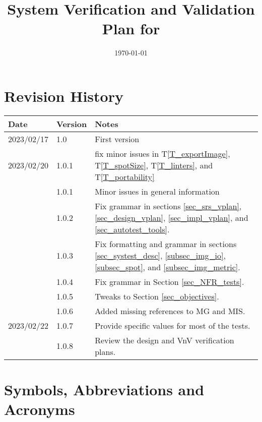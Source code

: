 \documentclass[12pt, titlepage]{article}
\begin{document}
\title{System Verification and Validation Plan for \progname{}} 
\author{\authname}
\date{\today}
	
\maketitle


\section{Revision History}

\begin{tabularx}{\textwidth}{p{2.2cm}p{1.8cm}X}
\toprule {\bf Date} & {\bf Version} & {\bf Notes}\\
\midrule
2023/02/17 & 1.0 & First version \\
2023/02/20 & 1.0.1 & fix minor issues in T\ref{T_exportImage}, T\ref{T_spotSize}, T\ref{T_linters}, 
  and T\ref{T_portability}\\
  & 1.0.1 & Minor issues in general information\\
  & 1.0.2 & Fix grammar in sections \ref{sec_srs_vplan}, 
  \ref{sec_design_vplan}, \ref{sec_impl_vplan}, and \ref{sec_autotest_tools}. \\
  & 1.0.3 & Fix formatting and grammar in sections \ref{sec_systest_desc}, 
  \ref{subsec_img_io}, \ref{subsec_spot}, and \ref{subsec_img_metric}. \\
  & 1.0.4 & Fix grammar in Section \ref{sec_NFR_tests}. \\
  & 1.0.5 & Tweaks to Section \ref{sec_objectives}. \\
  & 1.0.6 & Added missing references to MG and MIS. \\
2023/02/22 & 1.0.7 & Provide specific values for most of the tests. \\
  & 1.0.8 & Review the design and VnV verification plans. \\
\bottomrule
\end{tabularx}

\newpage

\tableofcontents

\listoftables

\newpage

\section{Symbols, Abbreviations and Acronyms}
\end{document}

